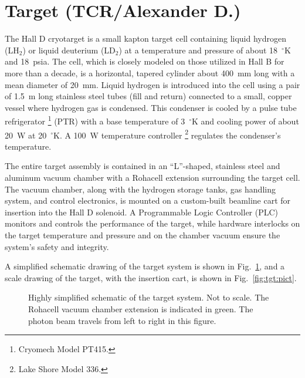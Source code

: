 \section[Target (TCR)]{Target \label{sec:target} (TCR/Alexander D.)}
The Hall D cryotarget is a small kapton target cell containing liquid
hydrogen (LH$_2$) or liquid deuterium (LD$_2$) at a temperature and pressure
of about 18~$^\circ$K and 18~psia. The cell, which is closely modeled on those
utilized in Hall B for more than a decade, is a horizontal, tapered
cylinder about 400~mm long with a mean diameter of 20~mm.  Liquid
hydrogen is introduced into the cell using a pair of 1.5~m long
stainless steel tubes (fill and return) connected to a small, copper
vessel where hydrogen gas is condensed.  This condenser is cooled by a
pulse tube refrigerator%
\footnote{Cryomech Model PT415.}
(PTR) with a base temperature of 3~$^\circ$K and
cooling power of about 20~W at 20~$^\circ$K.  
A 100~W temperature controller%
\footnote{Lake Shore Model 336.}
regulates the condenser's temperature.

The entire target assembly is contained in an ``L''-shaped,
stainless steel and aluminum vacuum chamber with a Rohacell extension
surrounding the target cell.  The vacuum chamber, along with the
hydrogen storage tanks, gas handling system, and control electronics,
is mounted on a custom-built beamline cart for insertion into the Hall
D solenoid.  A Programmable Logic Controller (PLC) monitors and
controls the performance of the target, while hardware interlocks on
the target temperature and pressure and on the chamber vacuum ensure
the system's safety and integrity.

A simplified schematic drawing of the target system is shown in 
Fig.~\ref{fig:tgt:scheme}, and a scale drawing of the target, 
with the insertion cart, is shown in Fig.~\ref{fig:tgt:pict}.



\begin{figure}[h]
\begin{center}
\end{center}
\caption{
Highly simplified schematic of the target system.  Not to scale.  The
Rohacell vacuum chamber extension is indicated in green.  The photon
beam travels from left to right in this figure.
\label{fig:tgt:scheme}}
\end{figure}

